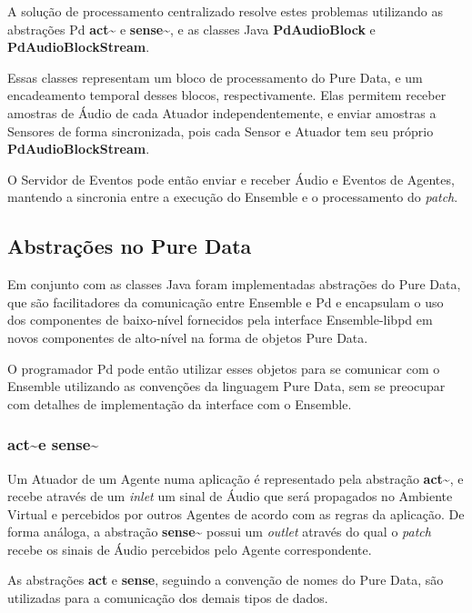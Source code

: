 \documentclass[a4paper, 11pt, twoside]{article}
\begin{document}
\begin{multicols}{2}
A solução de processamento centralizado resolve estes problemas utilizando
as abstrações Pd \textbf{act\textasciitilde} e \textbf{sense\textasciitilde},
e as classes Java \textbf{PdAudioBlock} e \textbf{PdAudioBlockStream}.

Essas classes representam um bloco de processamento do Pure Data, e um
encadeamento temporal desses blocos, respectivamente. Elas permitem
receber amostras de Áudio de cada Atuador independentemente, e enviar
amostras a Sensores de forma sincronizada, pois cada Sensor e Atuador
tem seu próprio \textbf{PdAudioBlockStream}.

O Servidor de Eventos pode então enviar e receber Áudio e Eventos de Agentes,
mantendo a sincronia entre a execução do Ensemble e o processamento 
do \textit{patch}.

\subsection{Abstrações no Pure Data}

Em conjunto com as classes Java foram implementadas abstrações do
Pure Data, que são facilitadores da comunicação entre Ensemble e Pd
e encapsulam o uso dos componentes de baixo-nível fornecidos pela
interface Ensemble-libpd em  novos componentes de alto-nível
na forma de objetos Pure Data.

O programador Pd pode então utilizar esses objetos para se comunicar
com o Ensemble utilizando as convenções da linguagem Pure Data,
sem se preocupar com detalhes de implementação da interface com o
Ensemble.

\subsubsection{act\textasciitilde e sense\textasciitilde}

Um Atuador de um Agente numa aplicação é representado pela abstração
\textbf{act\textasciitilde}, e recebe através de um \textit{inlet} 
um sinal de Áudio que será propagados no Ambiente 
Virtual e percebidos por outros Agentes de acordo com as regras da aplicação. 
De forma análoga, a abstração \textbf{sense\textasciitilde} possui um 
\textit{outlet} através do qual o \textit{patch} recebe os sinais de Áudio 
percebidos pelo Agente correspondente.

As abstrações \textbf{act} e \textbf{sense}, seguindo a convenção de nomes do
Pure Data, são utilizadas para a comunicação dos demais tipos de dados.


\end{multicols}
\end{document}

